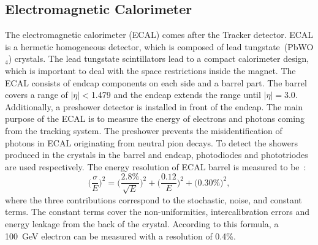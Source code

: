 \subsection{Electromagnetic Calorimeter}
The electromagnetic calorimeter (ECAL) comes after the Tracker detector. ECAL is a hermetic homogeneous detector, which is composed of lead tungstate~(PbWO$_4$) crystals. The lead tungstate scintillators lead to a compact calorimeter design, which is important to deal with the space restrictions inside the magnet. The ECAL consists of endcap components on each side and a barrel part. The barrel covers a range of $|\eta|<$1.479 and the endcap extends the range until $|\eta|=3.0$. Additionally, a preshower detector is installed in front of the endcap. The main purpose of the ECAL is to measure the energy of electrons and photons coming from the tracking system. The preshower prevents the misidentification of photons in ECAL originating from neutral pion decays. To detect the showers produced in the crystals in the barrel and endcap, photodiodes and phototriodes are used respectively.
The energy resolution of ECAL barrel is measured to be~\cite{ECAL_res}:
\begin{equation}
  \label{eqn:EcalRes}
   \Big(\frac{\sigma}{E}\Big)^2 = \Big(\frac{2.8\%}{\sqrt{E}}\Big)^2+\Big(\frac{0.12}{E}\Big)^2+\Big(0.30\%\Big)^2 ,
\end{equation}
where the three contributions correspond to the stochastic, noise, and constant terms. The constant terms cover the non-uniformities, intercalibration errors and energy leakage from the back of the crystal. According to this formula, a 100~GeV electron can be measured with a resolution of 0.4\%.
